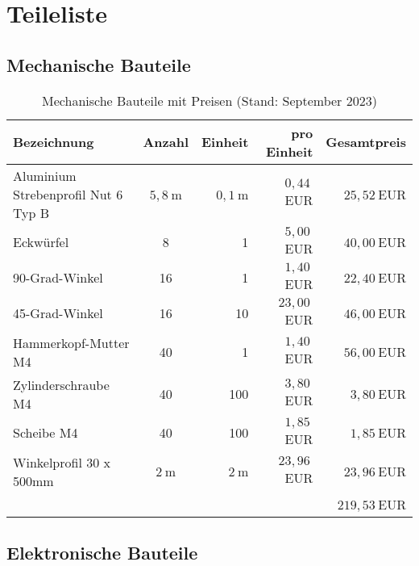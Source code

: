 \documentclass[./00_PhotoBox.tex]{subfiles}
\begin{document}
\chapter{Teileliste}
\section{Mechanische Bauteile}

\begin{table}[h]
    \centering
    \begin{tabular}{l|c|r|r|r}
        Bezeichnung                         & Anzahl  & Einheit & pro Einheit & Gesamtpreis  \\
        \hline
        Aluminium Strebenprofil Nut 6 Typ B & $5,8~$m & $0,1~$m & $0,44~$EUR  & $25,52~$EUR  \\
        Eckwürfel                           & 8       & 1       & $5,00~$EUR  & $40,00~$EUR  \\
        90-Grad-Winkel                      & 16      & 1       & $1,40~$EUR  & $22,40~$EUR  \\
        45-Grad-Winkel                      & 16      & 10      & $23,00~$EUR & $46,00~$EUR  \\
        Hammerkopf-Mutter M4                & 40      & 1       & $1,40~$EUR  & $56,00~$EUR  \\
        Zylinderschraube M4                 & 40      & 100     & $3,80~$EUR  & $3,80~$EUR   \\
        Scheibe M4                          & 40      & 100     & $1,85~$EUR  & $1,85~$EUR   \\
        Winkelprofil 30 x 500mm             & $2~$m   & $2~$m   & $23,96~$EUR & $23,96~$EUR  \\
                                            &         &         &             & $219,53~$EUR \\
    \end{tabular}
    \caption{Mechanische Bauteile mit Preisen (Stand: September 2023)}
    \label{tab:bauteile_mechanisch}
\end{table}
\section{Elektronische Bauteile}
\end{document}
